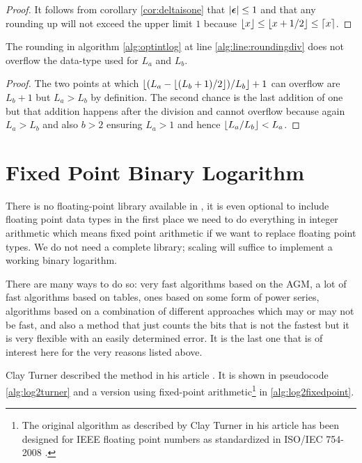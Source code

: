 \begin{proof}
It follows from corollary \ref{cor:deltaisone} that $\left\lvert\boldsymbol{\epsilon}\right\rvert \le 1$ and that
any rounding up will not exceed the upper limit $1$ because
$\left\lfloor x\right\rfloor \le \left\lfloor x + 1/2\right\rfloor \le \left\lceil x\right\rceil$.
\end{proof}
\begin{prop}
The rounding in  algorithm \ref{alg:optintlog} at line \ref{alg:line:roundingdiv}
does not overflow the data-type used for $L_a$ and $L_b$.
\end{prop}
\begin{proof}
The two points at which $\left\lfloor(L_a - \left\lfloor(L_b + 1)/2\right\rfloor) / L_b\right\rfloor + 1$ can overflow
are $L_b + 1$ but $L_a > L_b$ by definition. The second chance is the last addition
of one but that addition happens after the division and cannot overflow because
again $L_a > L_b$ and also $b > 2$ ensuring $L_a > 1$ and hence $\left\lfloor L_a / L_b\right\rfloor < L_a$.
\end{proof}
\pagebreak
\appendix
\section{Fixed Point Binary Logarithm}\label{sec:binlogturner}

There is no floating-point library available in \libtommath, it is even optional to include
floating point data types in the first place we need to do everything in integer arithmetic
which means fixed point arithmetic if we want to replace floating point types. We do not
need a complete library; scaling will suffice to implement a working binary logarithm.

There are many ways to do so: very fast algorithms based on the AGM\citep{bernstein2003computing},
a lot of fast algorithms based on tables, ones based on some form of power series, algorithms
based on a combination of different approaches which may or may not be fast\citep{mitchell1962computer},
and also a method that just counts the bits that is not the fastest but it is very flexible with an
easily determined error\citep{majithia1973note}. It is the last one that is of interest here for
the very reasons listed above.

Clay Turner described the method in his article \citep{turner2010fast}. It is shown in pseudocode
\ref{alg:log2turner} and a version using fixed-point arithmetic\footnote{%
The original algorithm as described by Clay Turner in his article has been designed for
IEEE floating point numbers as standardized in ISO/IEC 754-2008 \citep{ieee7542008}.
} in \ref{alg:log2fixedpoint}.

